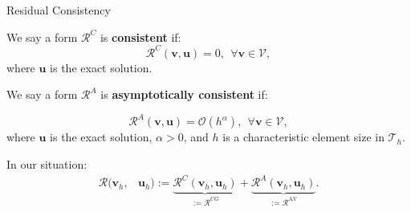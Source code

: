 \documentclass{beamer}
\newcounter{sectionframecount}
\begin{document}
\begin{frame}[t]{Residual Consistency}
\vspace{-10pt}
  \begin{itemize}
    \item We say a form $\mathcal{R}^C$ is \textbf{consistent} if:
    \begin{equation}
      \mathcal{R}^C(\boldsymbol{v},\boldsymbol{u}) = 0,~~\forall \boldsymbol{v} \in \mathcal{V},
    \end{equation}
    where $\boldsymbol{u}$ is the exact solution.

    {
    \item We say a form $\mathcal{R}^A$ is \textbf{asymptotically consistent} if:

    \begin{equation}
      \mathcal{R}^A(\boldsymbol{v},\boldsymbol{u}) = \mathcal{O}(h^\alpha),~~\forall \boldsymbol{v} \in \mathcal{V},
      \label{e:asymptotic_consistent}
    \end{equation}
    where $\boldsymbol{u}$ is the exact solution, $\alpha>0$, and $h$ is a characteristic element size in $\mathcal{T}_h$.
    }
  \end{itemize}

{
\vspace{10pt}
In our situation:
\vspace{-5pt}
\begin{equation}
  \begin{split}
  \mathcal{R}(\boldsymbol{v}_h,&\boldsymbol{u}_h) :=
  \underbrace{\mathcal{R}^C(\boldsymbol{v}_h,\boldsymbol{u}_h)}_{:= \mathcal{R}^{CG}} + \underbrace{\mathcal{R}^A(\boldsymbol{v}_h,\boldsymbol{u}_h)}_{:=\mathcal{R}^{\text{AV}}}.
  \end{split}
  \label{e:residual_C_A_decomposition}
\end{equation}
}
\end{frame}

\end{document}
